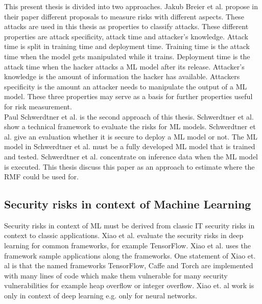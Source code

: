 This present thesis is divided into two approaches. Jakub Breier et al. \cite{DBLP:journals/corr/abs-2012-04884} propose in their paper different proposals to measure risks with different aspects.
These attacks are used in this thesis as properties to classify attacks. These different properties are attack specificity, attack time and attacker's knowledge. Attack time is split in training time
and deployment time. Training time is the attack time when the model gets manipulated while it trains. Deployment time is the attack time when the hacker attacks a ML model after its release.
Attacker's knowledge is the amount of information the hacker has available. Attackers specificity is the amount an attacker needs to manipulate the output of a ML model. These three properties may
serve as a basis for further properties useful for risk measurement. \\
Paul Schwerdtner et al. \cite{DBLP:journals/corr/abs-2011-04328} is the second approach of this thesis. Schwerdtner et al. show a technical framework to evaluate the risks for ML models. Schwerdtner et
al. give an evaluation whether it is secure to deploy a ML model or not. The ML model in Schwerdtner et al. must be a fully developed ML model that is trained and tested. Schwerdtner et al. concentrate
on inference data when the ML model is executed. This thesis discuss this paper as an approach to estimate where the RMF could be used for.

\subsection{Security risks in context of Machine Learning}

Security risks in context of ML must be derived from classic IT security risks in context to classic applications.
Xiao et al. \cite{DBLP:conf/sp/XiaoLZX18} evaluate the security risks in deep learning for common frameworks, for example TensorFlow. Xiao et al. uses the framework sample applications along the
frameworks. One statement of Xiao et. al is that the named frameworks TensorFlow, Caffe and Torch are implemented with many lines of code which make them vulnerable for many security vulnerabilities
for example heap overflow or integer overflow. Xiao et. al work is only in context of deep learning e.g. only for neural networks.

